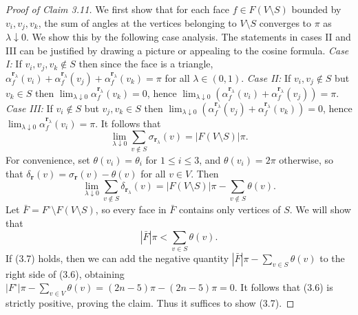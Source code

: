 \documentclass[UTF8,11pt]{ctexart}
\theoremstyle{definition}
\begin{document}
\begin{proof}[Proof of Claim 3.11]
We first show that for each face $f\in F(V\setminus S)$ bounded by $v_i,v_j,v_k$, the sum of angles at the vertices belonging to $V\setminus S$ converges to $\pi$ as $\lambda\downarrow0$. We show this by the following case analysis. The statements in cases II and III can be justified by drawing a picture or appealing to the cosine formula.
\emph{Case I:} If $v_i,v_j,v_k\notin S$ then since the face is a triangle,
$\alpha_f^{\mathbf r_\lambda}(v_i)+\alpha_f^{\mathbf r_\lambda}(v_j)+\alpha_f^{\mathbf r_\lambda}(v_k)=\pi$ for all $\lambda\in(0,1)$.
\emph{Case II:} If $v_i,v_j\notin S$ but $v_k\in S$ then $\lim_{\lambda\downarrow0}\alpha_f^{\mathbf r_\lambda}(v_k)=0$, hence $\lim_{\lambda\downarrow0}(\alpha_f^{\mathbf r_\lambda}(v_i)+\alpha_f^{\mathbf r_\lambda}(v_j))=\pi$.
\emph{Case III:} If $v_i\notin S$ but $v_j,v_k\in S$ then $\lim_{\lambda\downarrow0}(\alpha_f^{\mathbf r_\lambda}(v_j)+\alpha_f^{\mathbf r_\lambda}(v_k))=0$, hence $\lim_{\lambda\downarrow0}\alpha_f^{\mathbf r_\lambda}(v_i)=\pi$.
It follows that
\[
\lim_{\lambda\downarrow0}\sum_{v\notin S}\sigma_{\mathbf r_\lambda}(v)=|F(V\setminus S)|\pi.\tag{3.5}
\]
For convenience, set $\theta(v_i)=\theta_i$ for $1\le i\le3$, and $\theta(v_i)=2\pi$ otherwise, so that $\delta_{\mathbf r}(v)=\sigma_{\mathbf r}(v)-\theta(v)$ for all $v\in V$. Then
\[
\lim_{\lambda\downarrow0}\sum_{v\notin S}\delta_{\mathbf r_\lambda}(v)
=|F(V\setminus S)|\pi-\sum_{v\notin S}\theta(v).\tag{3.6}
\]
Let $\bar F=F^\circ\setminus F(V\setminus S)$, so every face in $\bar F$ contains only vertices of $S$. We will show that
\[
|\bar F|\pi<\sum_{v\in S}\theta(v).\tag{3.7}
\]
If (3.7) holds, then we can add the negative quantity $|\bar F|\pi-\sum_{v\in S}\theta(v)$ to the right side of (3.6), obtaining $|F^\circ|\pi-\sum_{v\in V}\theta(v)=(2n-5)\pi-(2n-5)\pi=0$. It follows that (3.6) is strictly positive, proving the claim. Thus it suffices to show (3.7).


\end{proof}
\end{document}
